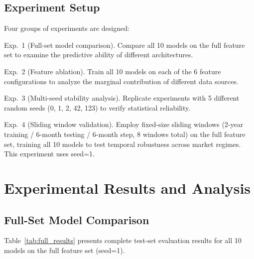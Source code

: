 \documentclass[a4paper]{cas-dc}
\begin{document}
\subsection{Experiment Setup}

Four groups of experiments are designed:

\medskip
\noindent Exp.~1 (Full-set model comparison). Compare all 10 models on the full feature set to examine the predictive ability of different architectures.

\smallskip
\noindent Exp.~2 (Feature ablation). Train all 10 models on each of the 6 feature configurations to analyze the marginal contribution of different data sources.

\smallskip
\noindent Exp.~3 (Multi-seed stability analysis). Replicate experiments with 5 different random seeds (0, 1, 2, 42, 123) to verify statistical reliability.

\smallskip
\noindent Exp.~4 (Sliding window validation). Employ fixed-size sliding windows (2-year training / 6-month testing / 6-month step, 8 windows total) on the full feature set, training all 10 models to test temporal robustness across market regimes. This experiment uses seed=1.

\section{Experimental Results and Analysis}

\subsection{Full-Set Model Comparison}

Table~\ref{tab:full_results} presents complete test-set evaluation results for all 10 models on the full feature set (seed=1).
\end{document}

